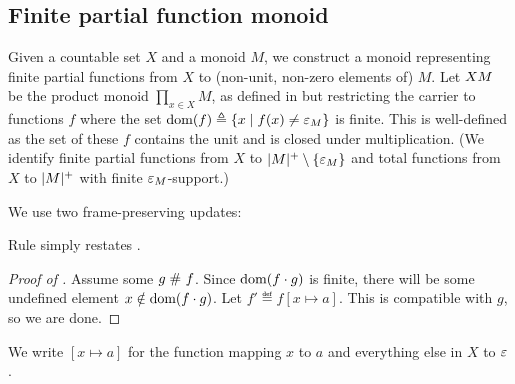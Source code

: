 \subsection{Finite partial function monoid}
\label{sec:fpfunm}

Given a countable set $X$ and a monoid $M$, we construct a monoid representing finite partial functions from $X$ to (non-unit, non-zero elements of) $M$.
Let ${X}  {M}$ be the product monoid $\prod_{x \in X} M$, as defined in  but restricting the carrier to functions $f$ where the set $\textrm{dom}(f) \triangleq \{ x \mid f(x) \neq \mathord{\varepsilon}_M \}$ is finite.
This is well-defined as the set of these $f$ contains the unit and is closed under multiplication.
(We identify finite partial functions from $X$ to $|M|^{+}\setminus\{\mathord{\varepsilon}_M\}$ and total functions from $X$ to $|M|^{+}$ with finite $\mathord{\varepsilon}_M$-support.)

We use two frame-preserving updates:
Rule  simply restates .

\begin{proof}[Proof of ]
  Assume some $g \mathrel{\#_{}} f$. Since $\textrm{dom}(f \mathbin{\cdot} g)$ is finite, there will be some undefined element $x \notin \textrm{dom}(f \mathbin{\cdot} g)$. Let $f' \eqdef f[x \mapsto a]$. This is compatible with $g$, so we are done.
\end{proof}

We write $[x \mapsto a]$ for the function mapping $x$ to $a$ and everything else in $X$ to $\mathord{\varepsilon}$.

